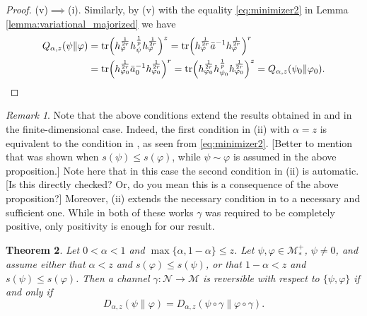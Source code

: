 \documentclass[12pt]{article}
\newtheorem{theorem}{Theorem}[section]
\theoremstyle{definition}
\theoremstyle{remark}
\newtheorem{remark}[theorem]{Remark}
\numberwithin{equation}{section}
\def\Me{\mathcal M}
\def\Ne{\mathcal N}
\def\Tr{\mathrm{tr}}
\def\ffi{\varphi}
\begin{document}
\begin{proof}
(v)$\implies$(i).\enspace
Similarly, by (v) with the equality \eqref{eq:minimizer2} in Lemma
\ref{lemma:variational_majorized} we have
\begin{align*}
Q_{\alpha,z}(\psi\|\ffi)
&=\Tr\Bigl(h_\ffi^{1\over2r}h_\psi^{1\over p}h_\ffi^{1\over2r}\Bigr)^z
=\Tr\Bigl(h_\ffi^{1\over2r}\bar a^{-1}h_\ffi^{1\over2r}\Bigr)^{r} \\
&=\Tr\Bigl(h_{\ffi_0}^{1\over2r}\bar a_0^{-1}h_{\ffi_0}^{1\over2r}\Bigr)^{r}
=\Tr\Bigl(h_{\ffi_0}^{1\over2r}h_{\psi_0}^{1\over p}h_{\ffi_0}^{1\over2r}\Bigr)^z
=Q_{\alpha,z}(\psi_0\|\ffi_0).
\end{align*}
\end{proof}


\begin{remark}\label{rem:conditions} Note that the above conditions extend the results
obtained in \cite{leditzky2017data} and \cite{zhang2020equality} in the finite-dimensional case.
Indeed, the {\color{red}first} condition in (ii) with $\alpha=z$ is equivalent to the condition in
\cite[Theorem 1]{leditzky2017data}, {\color{red}as seen from \eqref{eq:minimizer2}.}
{\color{red}[Better to mention that \cite[Theorem 1]{leditzky2017data} was shown when
$s(\psi)\le s(\ffi)$, while $\psi\sim\ffi$ is assumed in the above proposition.]}
Note here that in this case the second condition in (ii) is automatic. {\color{red}[Is this directly
checked? Or, do you mean this is a consequence of the above proposition?]}
Moreover, (ii) extends the necessary condition in \cite[Theorem 1.2(2)]{zhang2020equality}
to a necessary and sufficient one. While in both {\color{red}of} these works $\gamma$ was required
to be completely positive, only positivity is enough for our result. 
\end{remark}


\begin{theorem}\label{thm:suffle1} Let $0<\alpha<1$ and $\max\{\alpha,1-\alpha\}\le
z$. Let $\psi,\varphi\in \Me_*^+$, $\psi\ne0$, and assume either that $\alpha<z$ and $s(\ffi)\le
s(\psi)$, or that $1-\alpha<z$ and $s(\psi)\le s(\ffi)$. 
Then a channel $\gamma:\Ne \to \Me$ is reversible with respect to
$\{\psi,\varphi\}$ if and only if
\[
D_{\alpha,z}(\psi\|\varphi)=D_{\alpha,z}(\psi\circ\gamma\|\varphi\circ\gamma).
\]

\end{theorem}
\end{document}
